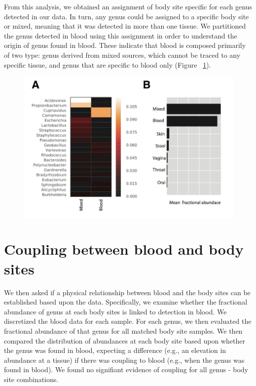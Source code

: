 From this analysis, we obtained an assignment of body site specific for each genus detected in our data. In turn, any genus could be assigned to a specific body site or mixed, meaning that it was detected in more than one tissue. We partitioned the genus detected in blood using this assignment in order to understand the origin of genus found in blood. These indicate that blood is composed primarily of two type: genus derived from mixed sources, which cannot be traced to any specific tissue, and genus that are specific to blood only (Figure ~\ref{fig:Fig14}).

\begin{figure}
\center\includegraphics[width=150mm,scale=0.5]{Figures/Fig14}
\caption{}
\label{fig:Fig14}
\end{figure}

\section{Coupling between blood and body sites}

We then asked if a physical relationship between blood and the body sites can be established based upon the data. Specifically, we examine whether the fractional abundance of genus at each body sites is linked to detection in blood. We discretized the blood data for each sample. For each genus, we then evaluated the fractional abundance of that genus for all matched body site samples. We then compared the distribution of abundances at each body site based upon whether the genus was found in blood, expecting a difference (e.g., an elevation in abundance at a tissue) if there was coupling to blood (e.g., when the genus was found in blood). We found no signifiant evidence of coupling for all genus - body site combinations. 

